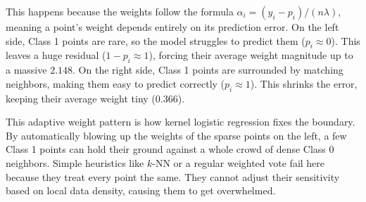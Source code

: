 \documentclass{article}
\begin{document}
This happens because the weights follow the formula $\alpha_i = (y_i - p_i) / (n\lambda)$, meaning a point's weight depends entirely on its prediction error. On the left side, Class 1 points are rare, so the model struggles to predict them ($p_i \approx 0$). This leaves a huge residual ($1 - p_i \approx 1$), forcing their average weight magnitude up to a massive $2.148$. On the right side, Class 1 points are surrounded by matching neighbors, making them easy to predict correctly ($p_i \approx 1$). This shrinks the error, keeping their average weight tiny ($0.366$).

This adaptive weight pattern is how kernel logistic regression fixes the boundary. By automatically blowing up the weights of the sparse points on the left, a few Class 1 points can hold their ground against a whole crowd of dense Class 0 neighbors. Simple heuristics like $k$-NN or a regular weighted vote fail here because they treat every point the same. They cannot adjust their sensitivity based on local data density, causing them to get overwhelmed.
\end{document}
